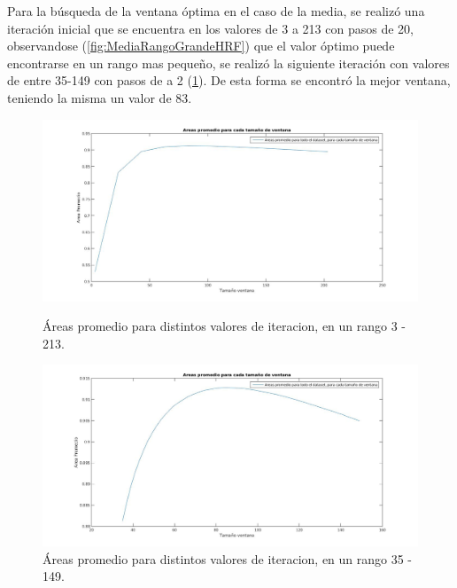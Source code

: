 Para la b\'usqueda de la ventana \'optima en el caso de la media, se realiz\'o una iteraci\'on inicial que se encuentra en los valores de 3 a 213 con pasos de 20, observandose (\ref{fig:MediaRangoGrandeHRF}) que el valor \'optimo puede encontrarse en un rango mas pequeño, se realiz\'o la siguiente iteraci\'on con valores de entre 35-149 con pasos de a 2 (\ref{fig:MediaRangoChicoHRF}). De esta forma se encontr\'o la mejor ventana, teniendo la misma un valor de 83.

\begin{figure}[H]
	{
	\centering
	\includegraphics[width=1\textwidth]{Figures/MediaRangoGrandeHRF}
	\caption[Media HRF]{\'Areas promedio para distintos valores de iteracion, en un rango 3 - 213.}
	\label{fig:MediaRangoGrandeHRF}
	
	\includegraphics[width=1\textwidth]{Figures/MediaRangoChicoHRF}
	\caption[Media HRF]{\'Areas promedio para distintos valores de iteracion, en un rango 35 - 149.}
	\label{fig:MediaRangoChicoHRF}
	}
\end{figure}


